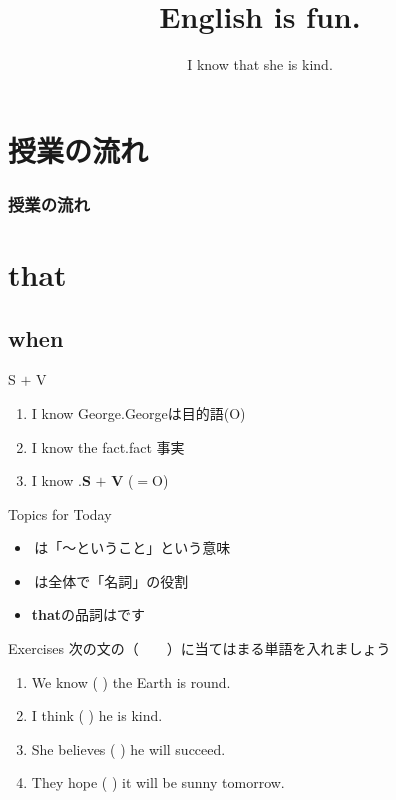 \documentclass[aspectratio=169,xcolor={dvipsnames,table}]{beamer}
\title{English is fun.}
\subtitle{I know that she is kind.}
\author{}
\institute[]{}
\date[]
\begin{document}
\begin{frame}[plain]
  \titlepage
\end{frame}


\section*{授業の流れ}
\begin{frame}[plain]
  \frametitle{授業の流れ}
  \tableofcontents
\end{frame}

\section{that }
\subsection{when}
\begin{frame}[plain]{S $+$ V }
\Large
\begin{enumerate}
 \item I know George.\hfill{\scriptsize Georgeは目的語(O)}
 \item I know the fact.\hfill{\scriptsize fact  事実}
 \item I know .\hfill{}{\small \textbf{S} $+$ \textbf{V} ($=$O)}

\end{enumerate}
\mbox{}\hfill{\scriptsize {}}

\begin{block}{Topics for Today}\small
\begin{itemize}[square]\small
 \item   {}\,は「〜ということ」という意味
 \item   {}\,は全体で「名詞」の役割
 \item  \textbf{that}の品詞はです
\end{itemize}
     \end{block}
\end{frame}
\begin{frame}[plain]{Exercises}
次の文の（　　）に当てはまる単語を入れましょう
 \begin{enumerate}
  \item We know  ( \visible<2->{that} ) the Earth is round.
  \item I think (  ) he is kind.
  \item She believes ( ) he will succeed.
 \item They hope ( ) it will be sunny tomorrow.
 \end{enumerate}
\end{frame}
\end{document}
